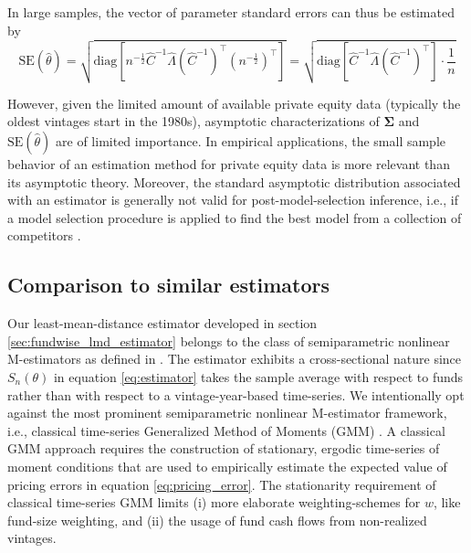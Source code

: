 \documentclass[12pt]{article}
\begin{document}
In large samples, the vector of parameter standard errors can thus be estimated by
\[
\mathrm{SE}(\hat{\theta}) = 
\sqrt{
	\mathrm{diag} \left[
	n^{-\frac{1}{2}}
	\hat{C}^{-1} \hat{\Lambda} (\hat{C}^{-1})^\top
	(n^{-\frac{1}{2}})^\top
	\right] 
}
=
\sqrt{
	\mathrm{diag} \left[
	\hat{C}^{-1} \hat{\Lambda} (\hat{C}^{-1})^\top
	\right] 
	\cdot \frac{1}{n}
}
\]
\iffalse
The Wald test statistic for linear hypotheses $H_0: R \theta = r$ and $H_1: R \theta \neq r$ is constructed as
\[
W = 
(R \hat{\theta} - r)^\top
\left[
R
\frac{\hat{C}^{-1} \hat{\Delta} (\hat{C}^{-1})^\top}{n}
R^\top
\right]^{-1}
(R \hat{\theta} - r)
\stackrel{H_0}{\sim}
\chi_q^2
\]
where $\hat{\theta}$ is the $p \times 1$ parameter vector, $R$ is a $q \times p$ matrix, and $r$ is a $q \times 1$ vector.
Usually, we select $R$ as $p \times p$ identity matrix, and $r$ as $p \times 1$ vector (e.g., of zeros).
Under the null hypothesis, $W$ is chi-squared distributed with $q$ degrees of freedom. As large values of $W$ indicate the rejection of $H_0$, the corresponding p-value is calculated as $1 - F_{\chi_q^2}(W)$ where $F_{\chi_q^2}$ is the cumulative distribution function of a chi-squared random variable with $q$ degrees of freedom.
\fi
However, given the limited amount of available private equity data (typically the oldest vintages start in the 1980s), asymptotic characterizations of $\mathbf{\Sigma}$ and $\mathrm{SE}(\hat{\theta})$ are of limited importance. 
In empirical applications, the small sample behavior of an estimation method for private equity data is more relevant than its asymptotic theory.
Moreover, the standard asymptotic distribution associated with an estimator is generally not valid for post-model-selection inference, i.e., if a model selection procedure is applied to find the best model from a collection of competitors \citep{LP05}.


\subsection{Comparison to similar estimators}

Our least-mean-distance estimator developed in section \ref{sec:fundwise_lmd_estimator} belongs to the class of semiparametric nonlinear M-estimators as defined in \cite{PP97}.
The estimator exhibits a cross-sectional nature since $S_n(\theta)$ in equation \ref{eq:estimator} takes the sample average with respect to funds rather than with respect to a vintage-year-based time-series.
We intentionally opt against the most prominent semiparametric nonlinear M-estimator framework, i.e., classical time-series Generalized Method of Moments (GMM) \citep{H82,H12}.
A classical GMM approach requires the construction of stationary, ergodic time-series of moment conditions that are used to empirically estimate the expected value of pricing errors in equation \ref{eq:pricing_error}.
The stationarity requirement of classical time-series GMM limits (i) more elaborate weighting-schemes for $w$, like fund-size weighting, and (ii) the usage of fund cash flows from non-realized vintages.
\end{document}
